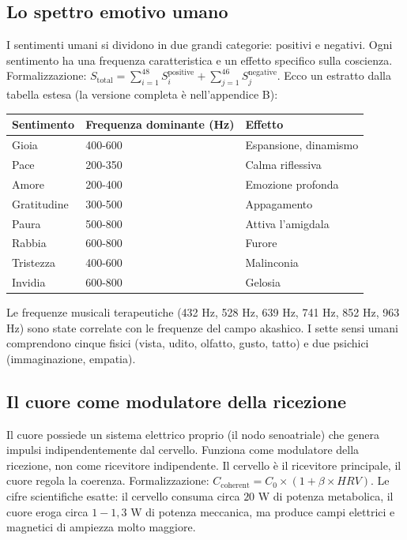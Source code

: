 \subsection{Lo spettro emotivo umano}
I sentimenti umani si dividono in due grandi categorie: positivi e negativi. Ogni sentimento ha una frequenza caratteristica e un effetto specifico sulla coscienza. Formalizzazione: $S_{\text{total}} = \sum_{i=1}^{48} S_i^{\text{positive}} + \sum_{j=1}^{46} S_j^{\text{negative}}$. Ecco un estratto dalla tabella estesa (la versione completa è nell'appendice B):
\begin{table}[H]
\centering
\begin{tabular}{@{}lll@{}}
\toprule
\textbf{Sentimento} & \textbf{Frequenza dominante (Hz)} & \textbf{Effetto} \\ \midrule
Gioia & 400-600 & Espansione, dinamismo \\
Pace & 200-350 & Calma riflessiva \\
Amore & 200-400 & Emozione profonda \\
Gratitudine & 300-500 & Appagamento \\
Paura & 500-800 & Attiva l'amigdala \\
Rabbia & 600-800 & Furore \\
Tristezza & 400-600 & Malinconia \\
Invidia & 600-800 & Gelosia \\ \bottomrule
\end{tabular}
\end{table}
Le frequenze musicali terapeutiche (432 Hz, 528 Hz, 639 Hz, 741 Hz, 852 Hz, 963 Hz) sono state correlate con le frequenze del campo akashico. I sette sensi umani comprendono cinque fisici (vista, udito, olfatto, gusto, tatto) e due psichici (immaginazione, empatia).

\subsection{Il cuore come modulatore della ricezione}
Il cuore possiede un sistema elettrico proprio (il nodo senoatriale) che genera impulsi indipendentemente dal cervello. Funziona come modulatore della ricezione, non come ricevitore indipendente. Il cervello è il ricevitore principale, il cuore regola la coerenza. Formalizzazione: $C_{\text{coherent}} = C_0 \times (1 + \beta \times HRV)$. Le cifre scientifiche esatte: il cervello consuma circa $20$ W di potenza metabolica, il cuore eroga circa $1-1,3$ W di potenza meccanica, ma produce campi elettrici e magnetici di ampiezza molto maggiore.

